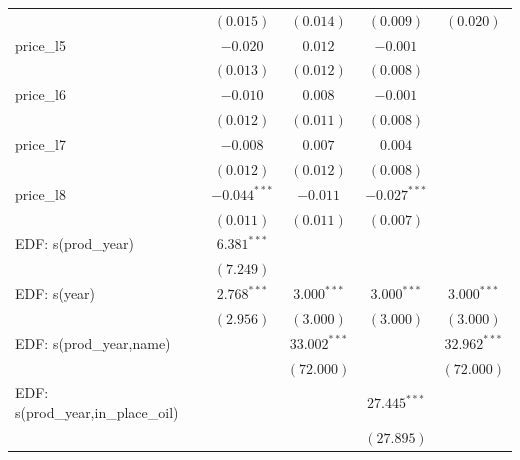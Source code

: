 \documentclass[12pt]{article}
\begin{document}
\begin{table}
\begin{center}
\begin{tabular}{l c c c c }
                                             & $(0.015)$      & $(0.014)$      & $(0.009)$        & $(0.020)$      \\
price\_l5                              & $-0.020$       & $0.012$        & $-0.001$         &                \\
                                             & $(0.013)$      & $(0.012)$      & $(0.008)$        &                \\
price\_l6                              & $-0.010$       & $0.008$        & $-0.001$         &                \\
                                             & $(0.012)$      & $(0.011)$      & $(0.008)$        &                \\
price\_l7                              & $-0.008$       & $0.007$        & $0.004$          &                \\
                                             & $(0.012)$      & $(0.012)$      & $(0.008)$        &                \\
price\_l8                              & $-0.044^{***}$ & $-0.011$       & $-0.027^{***}$   &                \\
                                             & $(0.011)$      & $(0.011)$      & $(0.007)$        &                \\
EDF: s(prod\_year)                           & $6.381^{***}$  &                &                  &                \\
                                             & $(7.249)$      &                &                  &                \\
EDF: s(year)                                 & $2.768^{***}$  & $3.000^{***}$  & $3.000^{***}$    & $3.000^{***}$  \\
                                             & $(2.956)$      & $(3.000)$      & $(3.000)$        & $(3.000)$      \\
EDF: s(prod\_year,name)                      &                & $33.002^{***}$ &                  & $32.962^{***}$ \\
                                             &                & $(72.000)$     &                  & $(72.000)$     \\
EDF: s(prod\_year,in\_place\_oil) &                &                & $27.445^{***}$   &                \\
                                             &                &                & $(27.895)$       &                \\

\end{tabular}
\end{center}
\end{table}
\end{document}
